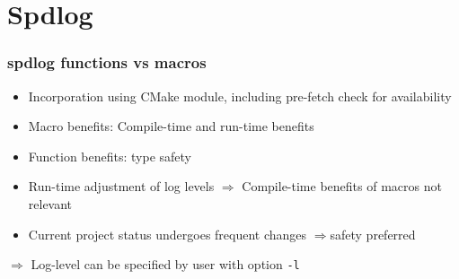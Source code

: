 \section{Spdlog}

\begin{frame}
    \frametitle{spdlog functions vs macros}

    \begin{itemize}
        \item Incorporation using CMake module, including pre-fetch check for availability
        \item Macro benefits: Compile-time and run-time benefits
        \item Function benefits: type safety
        \item Run-time adjustment of log levels $\Rightarrow$ Compile-time benefits of macros not relevant
        \item Current project status undergoes frequent changes $\Rightarrow $safety preferred
    \end{itemize}
    \bigskip

    $\Rightarrow$ Log-level can be specified by user with option \texttt{-l}

\end{frame}

